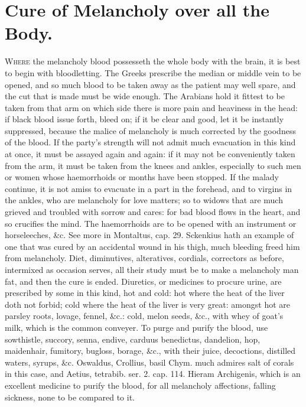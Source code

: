 
\section{Cure of Melancholy over all the Body.}

\lettrine{W}{here} the melancholy blood possesseth the whole body with the brain,
 it is best to begin with bloodletting. The Greeks prescribe the
 median or middle vein to be opened, and so much blood to be
taken away as the patient may well spare, and the cut that is made must
be wide enough. The Arabians hold it fittest to be taken from that arm
on which side there is more pain and heaviness in the head: if black
blood issue forth, bleed on; if it be clear and good, let it be
instantly suppressed,  because the malice of melancholy is much
corrected by the goodness of the blood. If the party's strength will
not admit much evacuation in this kind at once, it must be assayed
again and again: if it may not be conveniently taken from the arm, it
must be taken from the knees and ankles, especially to such men or
women whose haemorrhoids or months have been stopped.  If the
malady continue, it is not amiss to evacuate in a part in the forehead,
and to virgins in the ankles, who are melancholy for love matters; so
to widows that are much grieved and troubled with sorrow and cares: for
bad blood flows in the heart, and so crucifies the mind. The
haemorrhoids are to be opened with an instrument or horseleeches, \&c.
See more in Montaltus, cap. 29. Sckenkius hath an example of one
that was cured by an accidental wound in his thigh, much bleeding freed
him from melancholy. Diet, diminutives, alteratives, cordials,
correctors as before, intermixed as occasion serves, all their
study must be to make a melancholy man fat, and then the cure is ended.
Diuretics, or medicines to procure urine, are prescribed by some in
this kind, hot and cold: hot where the heat of the liver doth not
forbid; cold where the heat of the liver is very great: amongst
hot are parsley roots, lovage, fennel, \&c.: cold, melon seeds, \&c.,
with whey of goat's milk, which is the common conveyer.
To purge and purify the blood, use sowthistle, succory, senna,
endive, carduus benedictus, dandelion, hop, maidenhair, fumitory,
bugloss, borage, \&c., with their juice, decoctions, distilled waters,
syrups, \&c.
Oswaldus, Crollius, basil Chym. much admires salt of corals in this
case, and Aetius, tetrabib. ser. 2. cap. 114. Hieram Archigenis, which
is an excellent medicine to purify the blood, for all melancholy
affections, falling sickness, none to be compared to it.

